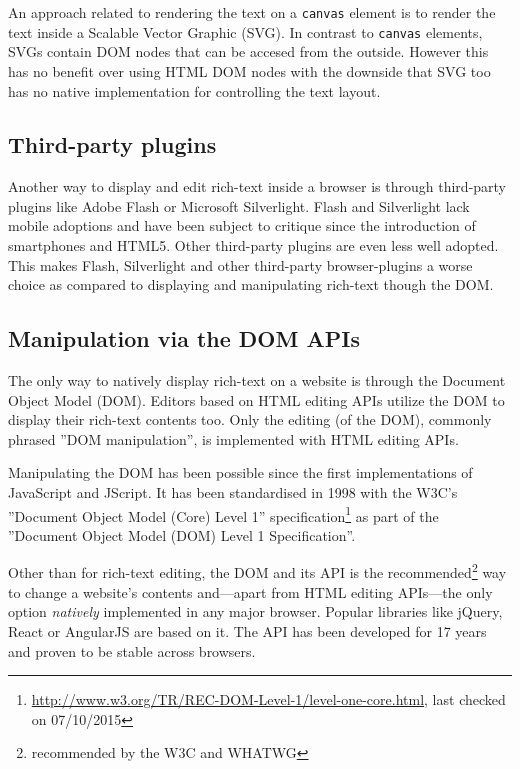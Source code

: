 An approach related to rendering the text on a \texttt{canvas} element is to render the text inside a Scalable Vector Graphic (SVG). In contrast to \texttt{canvas} elements, SVGs contain DOM nodes that can be accesed from the outside. However this has no benefit over using HTML DOM nodes with the downside that SVG too has no native implementation for controlling the text layout.

\subsection{Third-party plugins}

Another way to display and edit rich-text inside a browser is through third-party plugins like Adobe Flash or Microsoft Silverlight. Flash and Silverlight lack mobile adoptions and have been subject to critique since the introduction of smartphones and HTML5. Other third-party plugins are even less well adopted. This makes Flash, Silverlight and other third-party browser-plugins a worse choice as compared to displaying and manipulating rich-text though the DOM.

\subsection{Manipulation via the DOM APIs}
\label{subsec:manip_via_dom}

The only way to natively display rich-text on a website is through the Document Object Model (DOM). Editors based on HTML editing APIs utilize the DOM to display their rich-text contents too. Only the editing (of the DOM), commonly phrased ''DOM manipulation'', is implemented with HTML editing APIs.


Manipulating the DOM has been possible since the first implementations of JavaScript and JScript. It has been standardised in 1998 with the W3C's ''Document Object Model (Core) Level 1'' specification\footnote{\url{http://www.w3.org/TR/REC-DOM-Level-1/level-one-core.html}, last checked on 07/10/2015} as part of the ''Document Object Model (DOM) Level 1 Specification''.

Other than for rich-text editing, the DOM and its API is the recommended\footnote{recommended by the W3C and WHATWG} way to change a website's contents and---apart from HTML editing APIs---the only option \textit{natively} implemented in any major browser. Popular libraries like jQuery, React or AngularJS are based on it. The API has been developed for 17 years and proven to be stable across browsers. 

